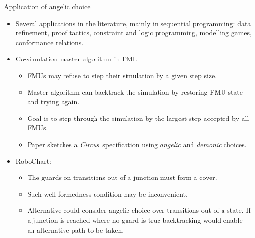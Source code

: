 \documentclass[%
slidestop,%
compress,%
mathserif,%
table,%
usenames,%
aspectratio=169,
dvipsnames,%
]{beamer}%
\def\Circus{{\sf\slshape Circus}}
\begin{document}
\begin{frame}{Application of angelic choice}
    \begin{itemize}
        \item Several applications in the literature, mainly in sequential programming: data refinement, proof tactics, constraint and logic programming, modelling games, conformance relations.
        \item Co-simulation master algorithm in FMI: 
        \begin{itemize}
            \item FMUs may refuse to step their simulation by a given step size.
            \item Master algorithm can backtrack the simulation by restoring FMU state and trying again.
            \item Goal is to step through the simulation by the largest step accepted by all FMUs.
            \item Paper sketches a \Circus~specification using \emph{angelic} and \emph{demonic} choices.
        \end{itemize}
        \item RoboChart:
        \begin{itemize}
            \item The guards on transitions out of a junction must form a cover.
            \item Such well-formedness condition may be inconvenient.
            \item Alternative could consider angelic choice over transitions out of a state. If a junction is reached where no guard is true backtracking would enable an alternative path to be taken.
        \end{itemize}
    \end{itemize}
\end{frame}
\end{document}
